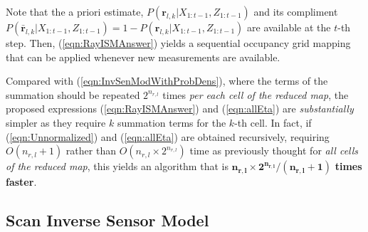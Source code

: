 \documentclass[letterpaper, 10pt, conference]{ieeeconf}
\newcommand{\refeqn}[1]{(\ref{eqn:#1})}
\begin{document}
Note that the a priori estimate, $P(\mathbf{r}_{l,k}|X_{1:t-1},Z_{1:t-1})$ and its compliment $P(\bar{\mathbf{r}}_{l,k}|X_{1:t-1},Z_{1:t-1})=1-P(\mathbf{r}_{l,k}|X_{1:t-1},Z_{1:t-1})$ are available at the $t$-th step. Then, \refeqn{RayISMAnswer} yields a sequential occupancy grid mapping that can be applied whenever new measurements are available. 

Compared with \refeqn{InvSenModWithProbDens}, where the terms of the summation should be repeated $2^{n_{r,l}}$ times \emph{per each cell of the reduced map}, the proposed expressions \refeqn{RayISMAnswer} and \refeqn{allEta} are \textit{substantially} simpler as they require $k$ summation terms for the $k$-th cell. In fact, if \refeqn{Unnormalized} and \refeqn{allEta} are obtained recursively, requiring $O(n_{r,l}+1)$ rather than $O(n_{r,l}\times2^{n_{r,l}})$ time as previously thought for \emph{all cells of the reduced map}, this yields an algorithm that is $\mathbf{n_{r,l}\times2^{n_{r,l}}/(n_{r,l}+1)}$ \textbf{times faster}.


\subsection{Scan Inverse Sensor Model}



\end{document}
